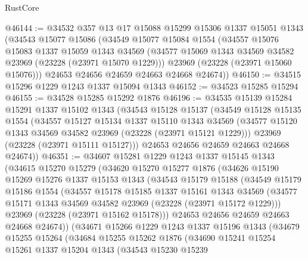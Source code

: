 \begin{lexlean}{RustCore}
\begin{coremodule}
@46144 := @34532
    @357
    @13
    @17
    @15088
    @15299
    @15306
    @1337
    @15051
    @1343
    (@34543
      @15077
      @15086
      (@34549
        @15077
        @15084
        @1554
        (@34557
          @15076
          @15083
          @1337
          @15059
          @1343
          @34569
          (@34577 @15069 @1343 @34569 @34582 @23969 (@23228 (@23971 @15070 @1229)))
          @23969
          (@23228 (@23971 @15060 @15076)))
        @24653
        @24656
        @24659
        @24663
        @24668
        @24674))
@46150 := @34515 @15296 @1229 @1243 @1337 @15094 @1343
@46152 := @34523 @15285 @15294
@46155 := @34528 @15285 @15292 @1876
@46196 := @34535
    @15139
    @15284
    @15291
    @1337
    @15102
    @1343
    (@34543
      @15128
      @15137
      (@34549
        @15128
        @15135
        @1554
        (@34557
          @15127
          @15134
          @1337
          @15110
          @1343
          @34569
          (@34577 @15120 @1343 @34569 @34582 @23969 (@23228 (@23971 @15121 @1229)))
          @23969
          (@23228 (@23971 @15111 @15127)))
        @24653
        @24656
        @24659
        @24663
        @24668
        @24674))
@46351 := @34607
    @15281
    @1229
    @1243
    @1337
    @15145
    @1343
    (@34615
      @15270
      @15279
      (@34620
        @15270
        @15277
        @1876
        (@34626
          @15190
          @15269
          @15276
          @1337
          @15153
          @1343
          (@34543
            @15179
            @15188
            (@34549
              @15179
              @15186
              @1554
              (@34557
                @15178
                @15185
                @1337
                @15161
                @1343
                @34569
                (@34577 @15171 @1343 @34569 @34582 @23969 (@23228 (@23971 @15172 @1229)))
                @23969
                (@23228 (@23971 @15162 @15178)))
              @24653
              @24656
              @24659
              @24663
              @24668
              @24674))
          (@34671
            @15266
            @1229
            @1243
            @1337
            @15196
            @1343
            (@34679
              @15255
              @15264
              (@34684
                @15255
                @15262
                @1876
                (@34690
                  @15241
                  @15254
                  @15261
                  @1337
                  @15204
                  @1343
                  (@34543
                    @15230
                    @15239

\end{coremodule}
\end{lexlean}
